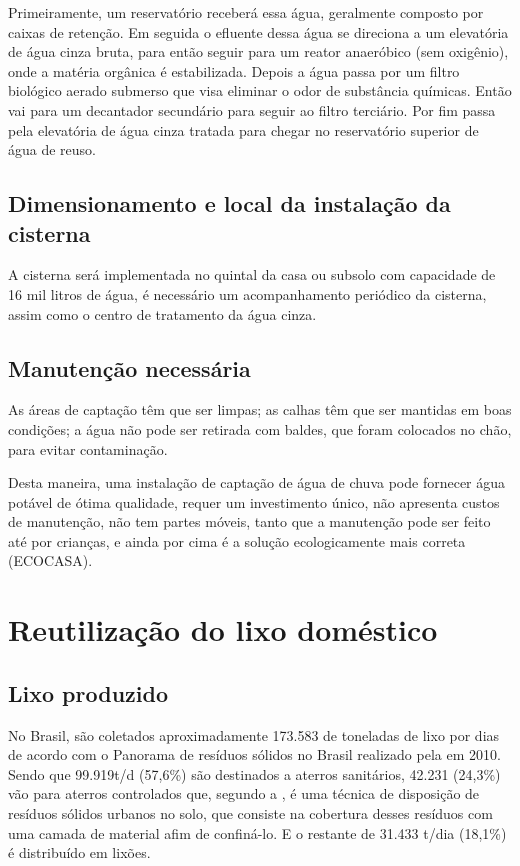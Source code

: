 	Primeiramente, um reservatório receberá essa água, geralmente composto por caixas de retenção. Em seguida o efluente dessa água se direciona a um elevatória de água cinza bruta, para então seguir para um reator anaeróbico (sem oxigênio), onde a matéria orgânica é estabilizada. Depois a água passa por um filtro biológico aerado submerso que visa eliminar o odor de substância químicas. Então vai para um decantador secundário para seguir ao filtro terciário. Por fim passa pela elevatória de água cinza tratada para chegar no reservatório superior de água de reuso.

\subsection{Dimensionamento e local da instalação da cisterna}

A cisterna será implementada no quintal da casa ou subsolo com capacidade de 16 mil litros de água, é necessário um acompanhamento periódico da cisterna, assim como o centro de tratamento da água cinza.

\subsection{Manutenção necessária}

	As áreas de captação têm que ser limpas; as calhas têm que ser mantidas em boas condições; a água não pode ser retirada com baldes, que foram colocados no chão, para evitar contaminação.

	Desta maneira, uma instalação de captação de água de chuva pode fornecer água potável de ótima qualidade, requer um investimento único, não apresenta custos de manutenção, não tem partes móveis, tanto que a manutenção pode ser feito até por crianças, e ainda por cima é a solução ecologicamente mais correta (ECOCASA).

\section{Reutilização do lixo doméstico}

\subsection{Lixo produzido}

	No Brasil, são coletados aproximadamente 173.583 de toneladas de lixo por dias de acordo com o Panorama de resíduos sólidos no Brasil realizado pela \cite{ABRELPE} em 2010. Sendo que 99.919t/d (57,6\%) são destinados a aterros sanitários, 42.231 (24,3\%) vão para aterros controlados que, segundo a \cite{NBR8849:1985}, é uma técnica de disposição de resíduos sólidos urbanos no solo, que consiste na cobertura desses resíduos com uma camada de material afim de confiná-lo. E o restante de 31.433 t/dia (18,1\%) é distribuído em lixões.

